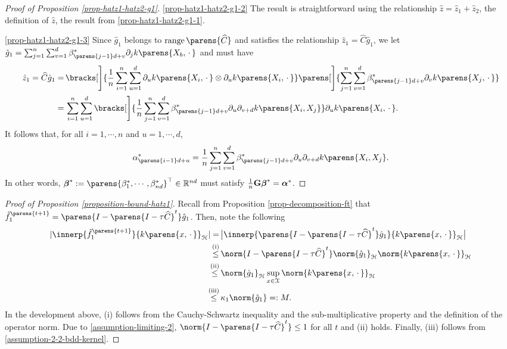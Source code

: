 \begin{proof}[Proof of Proposition \ref{prop-hatz1-hatz2-g1}]
		
	\ref{prop-hatz1-hatz2-g1-2} The result is straightforward using the relationship $\hat{z} = \hat{z}_1 + \hat{z}_2$, the definition of $\hat{z}$, the result from \ref{prop-hatz1-hatz2-g1-1}. 
	
	\ref{prop-hatz1-hatz2-g1-3} Since $\hat{g}_1$ belongs to $\range \parens{\widehat{C}}$ and satisfies the relationship $\hat{z}_1 = \widehat{C} \hat{g}_1$, we let $\hat{g}_1 = \sum_{j=1}^n \sum_{v=1}^d \beta_{\parens{j-1}d+v}^* \partial_j k \parens{X_b, \,\cdot\,}$ and must have 
	\begin{align*}
		\hat{z}_1 = \widehat{C} \hat{g}_1 = & \, \bracks[\Bigg]{\frac{1}{n} \sum_{i=1}^n \sum_{u=1}^d \partial_u k \parens{X_i, \,\cdot\,} \otimes \partial_u k \parens{X_i, \,\cdot\,}} \parens[\Bigg]{\sum_{j=1}^n \sum_{v=1}^d \beta_{\parens{j-1}d+v}^* \partial_v k \parens{X_j, \,\cdot\,}} \nonumber \\ 
		= & \, \sum_{i=1}^n \sum_{u=1}^d \bracks[\Bigg]{ \frac{1}{n} \sum_{j=1}^n \sum_{v=1}^d \beta_{\parens{j-1}d+v}^* \partial_u \partial_{v+d} k \parens{X_i, X_j}} \partial_u k \parens{X_i, \,\cdot\,}. 
	\end{align*}
	It follows that, for all $i = 1, \cdots, n$ and $u = 1, \cdots, d$, 
	\begin{align*}
		\alpha^*_{\parens{i-1}d+u} = \frac{1}{n} \sum_{j=1}^n \sum_{v=1}^d \beta_{\parens{j-1}d+v}^* \partial_u \partial_{v+d} k \parens{X_i, X_j}. 
	\end{align*}
	In other words, $\bbeta^* := \parens{\beta_1^*, \cdots, \beta_{nd}^*}^\top \in \Real^{nd}$ must satisfy $\frac{1}{n} \mathbf{G} \boldsymbol{\beta}^* = \boldsymbol{\alpha}^*$. 
\end{proof}


\begin{proof}[Proof of Proposition \ref{proposition-bound-hatz1}]
	Recall from Proposition \ref{prop-decomposition-ft} that $\hat{f}_1^{\parens{t+1}} = \parens{I - \parens{I - \tau \widehat{C}}^t} \hat{g}_1$. Then, note the following 
	\begin{align*}
		\abs{\innerp{\hat{f}_1^{\parens{t+1}}}{k \parens{x, \,\cdot\,}}_{\calH}} = & \, \abs[\big]{\innerp{\parens{I - \parens{I - \tau \widehat{C}}^t} \hat{g}_1}{k \parens{x, \,\cdot\,}}_{\calH}} \\ 
		\stackrel{\text{(i)}}{\le} & \, \norm{I - \parens{I - \tau \widehat{C}}^t} \norm{\hat{g}_1}_{\calH} \norm{k \parens{x, \,\cdot\,}}_{\calH} \\ 
		 \stackrel{\text{(ii)}}{\le} & \, \norm{\hat{g}_1}_{\calH} \sup_{x \in \calX} \norm{k \parens{x, \,\cdot\,}}_{\calH} \\ 
		 \stackrel{\text{(iii)}}{\le} & \, \kappa_1 \norm{\hat{g}_1} =: M. 
	\end{align*}
	In the development above, (i) follows from the Cauchy-Schwartz inequality and the sub-multiplicative property and the definition of the operator norm. Due to \ref{assumption-limiting-2}, $\norm{I - \parens{I - \tau \widehat{C}}^t} \le 1$ for all $t$ and (ii) holds. Finally, (iii) follows from \ref{assumption-2-2-bdd-kernel}. 
\end{proof}

